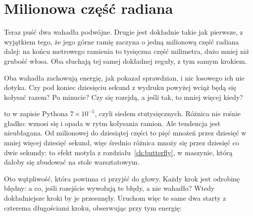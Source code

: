 \section{Milionowa część radiana}
\label{sec:ch13-apart}

\noindent
Teraz puść dwa wahadła podwójne. Drugie jest dokładnie takie jak pierwsze, z
wyjątkiem tego, że jego górne ramię zaczyna o jedną milionową część radiana
dalej: na końcu metrowego ramienia to tysięczna część milimetra, dużo mniej
niż grubość włosa. Oba słuchają tej samej dokładnej reguły, z tym samym
krokiem.

\begin{think}
Oba wahadła zachowują energię, jak pokazał sprawdzian, i nic losowego ich nie
dotyka. Czy pod koniec dziesięciu sekund z wydruku powyżej wciąż będą się
kołysać razem? Po minucie? Czy się rozejdą, a jeśli tak, to mniej więcej
kiedy?
\end{think}




\noindent
{} to w zapisie Pythona $7 \times 10^{-5}$, czyli siedem
stutysięcznych. Różnica nie rośnie gładko: wznosi się i opada w rytm
kołysania ramion. Ale tendencja jest nieubłagana. Od milionowej do
dziesiątej części to pięć mnożeń przez dziesięć w mniej więcej dziesięć sekund,
więc średnio różnica mnoży się przez dziesięć co dwie sekundy: to efekt
motyla z rozdziału~\ref{ch:butterfly}, w maszynie, którą dałoby się zbudować
na stole warsztatowym.


\noindent
Oto wątpliwość, która powinna ci przyjść do głowy. Każdy krok jest odrobinę
błędny: a co, jeśli rozejście wywołują te błędy, a nie wahadło? Wtedy
dokładniejsze kroki by je przesunęły. Uruchom więc te same dwa starty z
czterema długościami kroku, obserwując przy tym energię:

